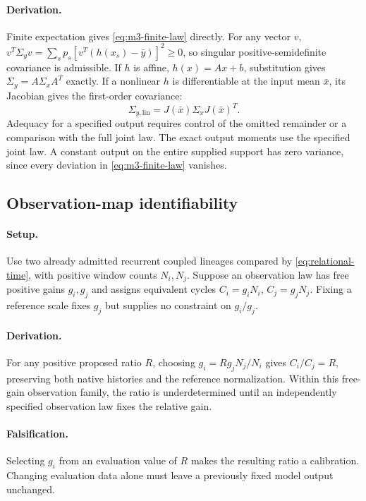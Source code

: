 \paragraph{Derivation.}
Finite expectation gives \eqref{eq:m3-finite-law} directly. For any vector
\(v\), \(v^T\Sigma_yv=\sum_sp_s[v^T(h(x_s)-\bar y)]^2\ge0\), so
singular positive-semidefinite covariance is admissible. If \(h\) is affine,
\(h(x)=Ax+b\), substitution gives \(\Sigma_y=A\Sigma_xA^T\) exactly.
If a nonlinear \(h\) is differentiable at the input mean \(\bar x\),
its Jacobian gives the first-order covariance:
\begin{equation}
 \Sigma_{y,\mathrm{lin}}=J(\bar x)\Sigma_xJ(\bar x)^T.
 \label{eq:m3-linear-covariance}
\end{equation}
Adequacy for a specified output requires control of the omitted remainder
or a comparison with the full joint law. The exact output moments use
the specified joint law. A constant output on the entire supplied support
has zero variance, since every deviation in \eqref{eq:m3-finite-law} vanishes.


\subsection{Observation-map identifiability}
\label{prop:m3-atomic-gain}
\paragraph{Setup.}
Use two already admitted recurrent coupled lineages compared by
\eqref{eq:relational-time}, with positive window counts \(N_i,N_j\).
Suppose an observation law has free positive gains \(g_i,g_j\) and assigns
equivalent cycles \(C_i=g_iN_i\), \(C_j=g_jN_j\).
Fixing a reference scale fixes \(g_j\) but supplies no constraint on \(g_i/g_j\).
\paragraph{Derivation.}
For any positive proposed ratio \(R\), choosing
\(g_i=R g_j N_j/N_i\) gives \(C_i/C_j=R\), preserving both native
histories and the reference normalization. Within this free-gain observation
family, the ratio is underdetermined until an independently specified
observation law fixes the relative gain.
\paragraph{Falsification.}
Selecting \(g_i\) from an evaluation value of \(R\) makes the resulting
ratio a calibration. Changing evaluation data alone must leave a previously
fixed model output unchanged.


